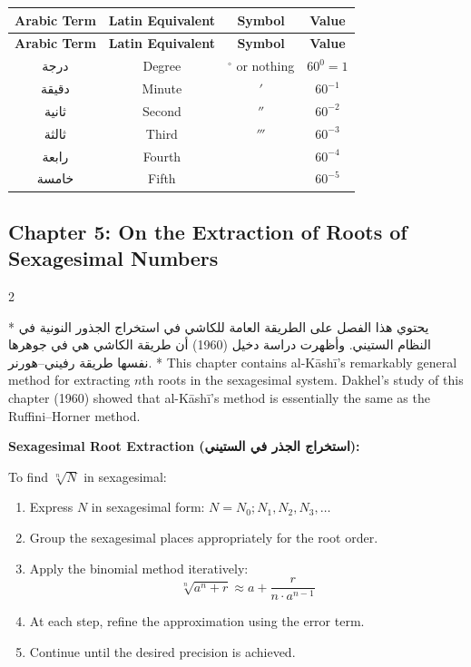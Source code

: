 \documentclass[11pt,a4paper]{article}
\newcommand{\ar}[1]{{\arabicfont\beginR #1\endR}}
\newenvironment{bilingual}{%
  \vspace{0.3em}%
  \begin{paracol}{2}%
}{%
  \end{paracol}%
  \vspace{0.3em}%
}
\newenvironment{mathalgo}{%
  \par\vspace{0.3cm}
  \begin{framed}
  \setlength{\parindent}{0pt}
}{%
  \end{framed}
  \par\vspace{0.3cm}
}
\begin{document}
\begin{longtable}{|c|c|c|c|}
\hline
\textbf{Arabic Term} & \textbf{Latin Equivalent} & \textbf{Symbol} &
\textbf{Value} \\
\hline
\endfirsthead
\hline
\textbf{Arabic Term} & \textbf{Latin Equivalent} & \textbf{Symbol} &
\textbf{Value} \\
\hline
\endhead
\ar{درجة} & Degree & $^\circ$ or nothing & $60^0 = 1$ \\
\hline
\ar{دقيقة} & Minute & $'$ & $60^{-1}$ \\
\hline
\ar{ثانية} & Second & $''$ & $60^{-2}$ \\
\hline
\ar{ثالثة} & Third & $'''$ & $60^{-3}$ \\
\hline
\ar{رابعة} & Fourth & & $60^{-4}$ \\
\hline
\ar{خامسة} & Fifth & & $60^{-5}$ \\
\hline
\end{longtable}

\subsection{Chapter 5: On the Extraction of Roots of Sexagesimal Numbers}

\begin{bilingual}
\switchcolumn[0]*
\ar{يحتوي هذا الفصل على الطريقة العامة للكاشي في استخراج الجذور النونية في النظام الستيني. وأظهرت دراسة دخيل (1960) أن طريقة الكاشي هي في جوهرها نفسها طريقة رفيني--هورنر.}
\switchcolumn[1]*
This chapter contains al-K\=ash\=i's remarkably general method for
extracting $n$th roots in the sexagesimal system. Dakhel's study of
this chapter (1960) showed that al-K\=ash\=i's method is essentially the
same as the Ruffini--Horner method.
\end{bilingual}

\begin{mathalgo}
\textbf{Sexagesimal Root Extraction (\ar{استخراج الجذر في الستيني}):}

To find $\sqrt[n]{N}$ in sexagesimal:
\begin{enumerate}[nosep]
  \item Express $N$ in sexagesimal form: $N = N_0; N_1, N_2, N_3, \ldots$
  \item Group the sexagesimal places appropriately for the root order.
  \item Apply the binomial method iteratively:
    \[
    \sqrt[n]{a^n + r} \approx a + \frac{r}{n \cdot a^{n-1}}
    \]
  \item At each step, refine the approximation using the error term.
  \item Continue until the desired precision is achieved.
\end{enumerate}
\end{mathalgo}
\end{document}
